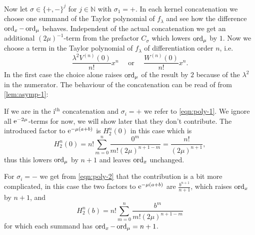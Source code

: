 \begin{MainTheorem}
\begin{Proof}
    Now let $\sigma\in\{+,-\}^j$ for $j\in\mathbb{N}$ with $\sigma_1 = +$. In
    each kernel concatenation we choose one summand of the Taylor polynomial of
    $f_\lambda$ and see how the difference $\operatorname{ord}_x - \operatorname{ord}_\mu$ behaves.
    Independent of the actual concatenation we get an additional
    $(2\mu)^{-1}$-term from the prefactor $C_\sigma$ which lowers $\operatorname{ord}_\mu$ by
    $1$. Now we choose a term in the Taylor polynomial of $f_\lambda$ of
    differentiation order $n$, i.e.\ 
    \begin{equation*}
      \frac{\lambda^2 V^{(n)}(0)}{n!} x^n \quad \text{ or } \quad
      \frac{W^{(n)}(0)}{n!}x^n.
    \end{equation*}
    In the first case the choice alone raises $\operatorname{ord}_\mu$ of the result by $2$
    because of the $\lambda^2$ in the numerator. The behaviour of the
    concatenation can be read of from \cref{lem:asymp-1}:
    
    If we are in the i$^{\text{th}}$ concatenation and $\sigma_i = +$ we refer to
    \cref{eqn:poly-1}. We ignore all $\mathrm e^{-2\mu}$-terms for now, we will show
    later that they don't contribute. The introduced factor to $\mathrm e^{-\mu(a+b)}$
    is $H^n_2(0)$ in this case which is
    \begin{equation*}
      H^n_2(0) = n! \sum_{m=0}^n \frac{0^m}{m!(2\mu)^{n+1-m}} =
      \frac{n!}{(2\mu)^{n+1}},
    \end{equation*}
    thus this lowers $\operatorname{ord}_\mu$ by $n+1$ and leaves $\operatorname{ord}_x$ unchanged.

    For $\sigma_i = -$ we get from \cref{eqn:poly-2} that the contribution is a
    bit more complicated, in this case the two factors to $\mathrm e^{-\mu(a+b)}$ are
    $\frac{b^{n+1}}{n+1}$, which raises $\operatorname{ord}_x$ by $n+1$, and
    \begin{equation*}
      H^n_2(b) = n! \sum_{m=0}^n \frac{b^m}{m!(2\mu)^{n+1-m}}
    \end{equation*}
    for which each summand has $\operatorname{ord}_x - \operatorname{ord}_\mu = n+1$.


\end{Proof}
\end{MainTheorem}
